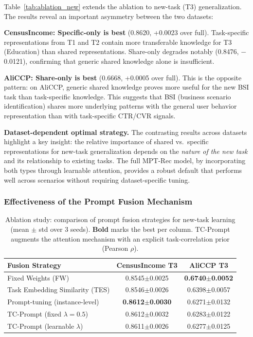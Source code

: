 \documentclass[review,anonymous]{acmart}
\begin{document}
Table~\ref{tab:ablation_new} extends the ablation to new-task (T3)
generalization. The results reveal an important asymmetry between the two
datasets:

\textbf{CensusIncome: Specific-only is best} (0.8620, +0.0023 over full).
Task-specific representations from T1 and T2 contain more transferable
knowledge for T3 (Education) than shared representations. Share-only degrades
notably (0.8476, $-$0.0121), confirming that generic shared knowledge alone is
insufficient.

\textbf{AliCCP: Share-only is best} (0.6668, +0.0005 over full). This is the
opposite pattern: on AliCCP, generic shared knowledge proves more useful for the
new BSI task than task-specific knowledge. This suggests that BSI (business
scenario identification) shares more underlying patterns with the general user
behavior representation than with task-specific CTR/CVR signals.

\textbf{Dataset-dependent optimal strategy.} The contrasting results across
datasets highlight a key insight: the relative importance of shared vs.\ specific
representations for new-task generalization depends on the \emph{nature of the
new task} and its relationship to existing tasks. The full MPT-Rec model, by
incorporating both types through learnable attention, provides a robust default
that performs well across scenarios without requiring dataset-specific tuning.

\subsubsection{Effectiveness of the Prompt Fusion Mechanism}
\label{sec:ablation_prompt}

\begin{table}[t]
  \centering
  \caption{Ablation study: comparison of prompt fusion strategies for new-task
           learning (mean $\pm$ std over 3 seeds). \textbf{Bold} marks the best
           per column. TC-Prompt augments the attention mechanism with an explicit
           task-correlation prior (Pearson $\rho$).}
  \label{tab:ablation_prompt}
  \begin{tabular}{lcc}
    \toprule
    \textbf{Fusion Strategy} & \textbf{CensusIncome T3} & \textbf{AliCCP T3} \\
    \midrule
    Fixed Weights (FW)                        & 0.8545$\pm$0.0025 & \textbf{0.6740}$\pm$\textbf{0.0052} \\
    Task Embedding Similarity (TES)           & 0.8546$\pm$0.0026 & 0.6398$\pm$0.0057 \\
    Prompt-tuning (instance-level)            & \textbf{0.8612}$\pm$\textbf{0.0030} & 0.6271$\pm$0.0132 \\
    \addlinespace
    TC-Prompt (fixed $\lambda=0.5$)           & 0.8612$\pm$0.0032 & 0.6283$\pm$0.0122 \\
    TC-Prompt (learnable $\lambda$)           & 0.8611$\pm$0.0026 & 0.6277$\pm$0.0125 \\
    \bottomrule
  \end{tabular}
\end{table}
\end{document}

